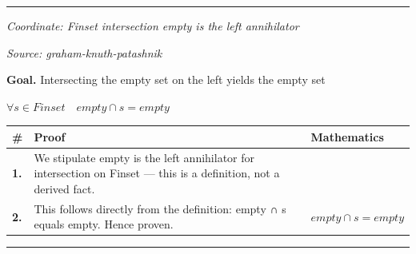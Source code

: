 \documentclass[11pt]{article}
\theoremstyle{definition}
\begin{document}
\label{thm:Finset-intersection-empty_is_the_right_annihilator}
\par\medskip\hrule
\bigskip
{}\par
\smallskip\noindent\textit{Coordinate: Finset \cdot intersection \cdot empty is the left annihilator}\par
\smallskip\noindent\textit{Source: graham-knuth-patashnik}\par
\medskip
\noindent\textbf{Goal.} Intersecting the empty set on the left yields the empty set\par
\noindent$\displaystyle \forall s \in Finset\quad empty ∩ s = empty$\par
\medskip
\noindent
\begin{tabular}{@{} >{\raggedright\arraybackslash}p{} >{\raggedright\arraybackslash}p{} >{\raggedleft\arraybackslash}p{} @{}}
\textbf{\#} & \textbf{Proof} & \textbf{Mathematics} \\
\midrule
\textbf{1.} & We stipulate empty is the left annihilator for intersection on Finset — this is a definition, not a derived fact. & \\[0.45em]
\textbf{2.} & This follows directly from the definition: empty ∩ s equals empty. Hence proven. & $\displaystyle empty ∩ s = empty$ \\[0.45em]
\bottomrule
\end{tabular}
\label{thm:Finset-intersection-empty_is_the_left_annihilator}
\par\medskip\hrule
\end{document}
